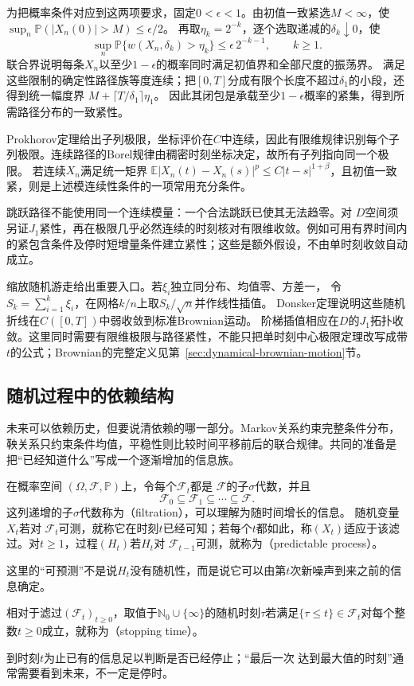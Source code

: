 为把概率条件对应到这两项要求，固定\(0<\epsilon<1\)。由初值一致紧选\(M<\infty\)，使
\(\sup_n\mathbb P(|X_n(0)|>M)\leq\epsilon/2\)。
再取\(\eta_k=2^{-k}\)，逐个选取递减的\(\delta_k\downarrow0\)，使
\[
 \sup_n\mathbb P\{w(X_n,\delta_k)>\eta_k\}
 \leq\epsilon\,2^{-k-1},\qquad k\geq1.
\]
联合界说明每条\(X_n\)以至少\(1-\epsilon\)的概率同时满足初值界和全部尺度的振荡界。
满足这些限制的确定性路径族等度连续；把\([0,T]\)分成有限个长度不超过\(\delta_1\)的小段，还得到统一幅度界
\(M+\lceil T/\delta_1\rceil\eta_1\)。
因此其闭包是承载至少\(1-\epsilon\)概率的紧集，得到所需路径分布的一致紧性。

Prokhorov定理给出子列极限，坐标评价在\(C\)中连续，因此有限维规律识别每个子列极限。连续路径的Borel规律由稠密时刻坐标决定，故所有子列指向同一个极限。
若连续\(X_n\)满足统一矩界
\(\mathbb E|X_n(t)-X_n(s)|^p\leq C|t-s|^{1+\beta}\)，且初值一致紧，则是上述模连续性条件的一项常用充分条件。

跳跃路径不能使用同一个连续模量：一个合法跳跃已使其无法趋零。对
\(D\)空间须另证\(J_1\)紧性，再在极限几乎必然连续的时刻核对有限维收敛。例如可用有界时间内的紧包含条件及停时短增量条件建立紧性；这些是额外假设，不由单时刻收敛自动成立。

缩放随机游走给出重要入口。若\(\xi_i\)独立同分布、均值零、方差一，
令\(S_k=\sum_{i=1}^k\xi_i\)，在网格\(k/n\)上取\(S_k/\sqrt n\)并作线性插值。
Donsker定理说明这些随机折线在\(C([0,T])\)中弱收敛到标准Brownian运动。
阶梯插值相应在\(D\)的\(J_1\)拓扑收敛。这里同时需要有限维极限与路径紧性，不能只把单时刻中心极限定理改写成带\(t\)的公式；Brownian的完整定义见第~\ref{sec:dynamical-brownian-motion}节。

\subsection{随机过程中的依赖结构}
\label{sec:stoch-martingales-stopping-sequential-concentration}
未来可以依赖历史，但要说清依赖的哪一部分。Markov关系约束完整条件分布，鞅关系只约束条件均值，平稳性则比较时间平移前后的联合规律。共同的准备是把“已经知道什么”写成一个逐渐增加的信息族。
\begin{definition}[滤过、适应与可预测性]
  \label{def:stoch-filtration-adaptation-predictability}
在概率空间
$(\Omega,\mathcal{F},\mathbb{P})$上，令每个$\mathcal{F}_t$都是
$\mathcal{F}$的子$\sigma$代数，并且
\[
  \mathcal{F}_0\subseteq\mathcal{F}_1\subseteq\cdots\subseteq\mathcal{F}.
\]
这列递增的子$\sigma$代数称为（filtration），可以理解为随时间增长的信息。
随机变量$X_t$若对
$\mathcal{F}_t$可测，就称它在时刻$t$已经可知；若每个$t$都如此，称$(X_t)$适应于该滤过。对$t\geq1$，过程$(H_t)$若$H_t$对
$\mathcal{F}_{t-1}$可测，就称为（predictable process）。
\end{definition}
这里的“可预测”不是说$H_t$没有随机性，而是说它可以由第$t$次新噪声到来之前的信息确定。
\begin{definition}[停时]
  \label{def:stoch-stopping-time}
  相对于滤过\((\mathcal F_t)_{t\geq0}\)，取值于\(\mathbb N_0\cup\{\infty\}\)的随机时刻$\tau$若满足$\{\tau\leq t\}\in\mathcal{F}_t$对每个整数$t\geq0$成立，就称为（stopping time）。
\end{definition}
到时刻$t$为止已有的信息足以判断是否已经停止；“最后一次
达到最大值的时刻”通常需要看到未来，不一定是停时。


